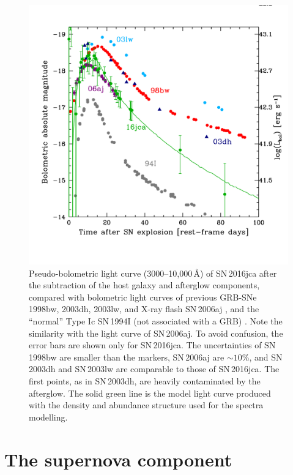 \documentclass[fleqn,usenatbib]{mnras}
\begin{document}
\begin{figure}
\centering
\includegraphics[scale=0.4]{plots/BOL.pdf}
\caption{Pseudo-bolometric light curve (3000--10,000\,\AA) of SN\,2016jca after the subtraction of the host galaxy and afterglow components, compared with bolometric light curves of previous GRB-SNe\,1998bw, 2003dh, 2003lw, and X-ray flash SN\,2006aj \citep{Galama98,Deng05,Malesani04,Pian06}, and the ``normal'' Type Ic SN\,1994I (not associated with a GRB) \citep{Richmond96}.   Note the similarity with the light curve of SN\,2006aj.  To avoid confusion, the error bars are shown only for SN\,2016jca.   The uncertainties of SN\,1998bw are smaller than the markers, SN\,2006aj are $\sim 10$\%, and SN\,2003dh and SN\,2003lw are comparable to those of SN\,2016jca. The first points, as in SN\,2003dh, are heavily contaminated by the afterglow. The solid green line is the model light curve produced with the density and abundance structure used for the spectra modelling.}
\label{fig:BolLC}
\end{figure}


\section{The supernova component}
\end{document}
